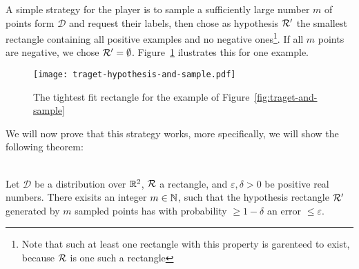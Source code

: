     A simple strategy for the player is to sample a sufficiently large number \(m\) of points form \(\mathcal{D}\) and request their labels, then chose as hypothesis \(\mathcal{R}^\prime\) the smallest rectangle containing all positive examples and no negative ones\footnote{Note that such at least one rectangle with this property is garenteed to exist, because \(\mathcal{R}\) is one such a rectangle}. If all \(m\) points are negative, we chose \(\mathcal{R}^\prime = \emptyset\). Figure~\ref{fig:traget-hypothesis-and-sample} ilustrates this for one example.

    \begin{figure}
        \begin{center}
            \texttt{[image: traget-hypothesis-and-sample.pdf]}
        \end{center}
        \caption{The tightest fit rectangle for the example of Figure~\ref{fig:traget-and-sample}}
        \label{fig:traget-hypothesis-and-sample}
    \end{figure}

    We will now prove that this strategy works, more specifically, we will show the following theorem:

    \begin{theorem}
        \ \\
        Let \(\mathcal{D}\) be a distribution over \(\mathbb{R}^2\), \(\mathcal{R}\) a rectangle, and \(\varepsilon, \delta>0\) be positive real numbers.
        There exisits an integer \(m\in\mathbb{N}\), such that the hypothesis rectangle \(\mathcal{R}^\prime\) generated by \(m\) sampled points has with probability \(\ge 1 - \delta\) an error \(\le\varepsilon\).
    \end{theorem}

